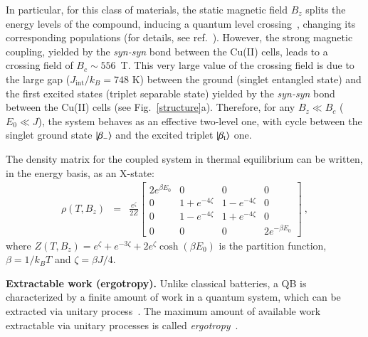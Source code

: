 \documentclass[aps,prl,epsfigure,twocolumn,superscriptaddress]{revtex4-1}
\newcommand{\1}{\mathbbm{1}}
\begin{document}
In particular, for this class of materials, the static magnetic field $B_z$ splits the energy levels of the compound, inducing a quantum level crossing~\cite{chakraborty2019magnetocaloric,cruz2020quantifying,breunig2017quantum}, changing its corresponding populations \cite{cruz2020quantifying} (for details, see ref.~\cite{SupInf}). However, the strong magnetic coupling, yielded by the \textit{syn-syn} bond between the Cu(II) cells, leads to a crossing field of $B_c\sim\!556$~T. This very large value of the crossing field is due to the large gap ($J_{\text{int}}/k_{B}\!=\!748$ K) between the ground (singlet entangled state) and the first excited states (triplet separable state) yielded by the \textit{syn-syn} bond between the Cu(II) cells (see Fig.~\ref{structure}{\color{blue}a}). Therefore, for any $B_{z}\ll B_{c}$ ($E_{0}\ll J$), the system behaves as an effective two-level one, with cycle between the singlet ground state $\ket{\beta_{-}}$ and the excited triplet $\ket{\beta_{\text{t}}}$ one. 

The density matrix for the coupled system in thermal equilibrium can be written, in the energy basis, as an X-state:
\begin{align}
	\rho(T,B_z) &=&\frac{e^{{\zeta}}}{2Z}\left[
	\begin{matrix} 2e^{\beta E_{0}} & 0 & 0 & 0 \\
		0& {1 +  e^{-4{\zeta}}} & {1 -  e^{-4{\zeta}}}  & 0\\
		0& {1 -  e^{-4{\zeta}}}  & {1 +  e^{-4{\zeta}}}  & 0\\
		0& 0& 0 & 2e^{-\beta E_{0}} 
	\end{matrix} \right]~,
	\label{longitudinal}
\end{align}
where $Z(T,B_z)\!=\!e^{{\zeta}} + e^{-3{\zeta}} + 2 e^{{\zeta}} \cosh\left(\beta E_{0}\right)$ is the partition function, $\beta\!=\!1/k_BT$ and ${\zeta}\!=\!\beta J/4$. 

\textbf{Extractable work (ergotropy).} 
Unlike classical batteries, a QB is characterized by a finite amount of work in a quantum system, which can be extracted via unitary process~\cite{Allahverdyan:04}. The maximum amount of available work extractable via unitary processes is called \textit{ergotropy}~\cite{Liu:19,Alicki:13,PhysRevE.102.042111}.
\end{document}
